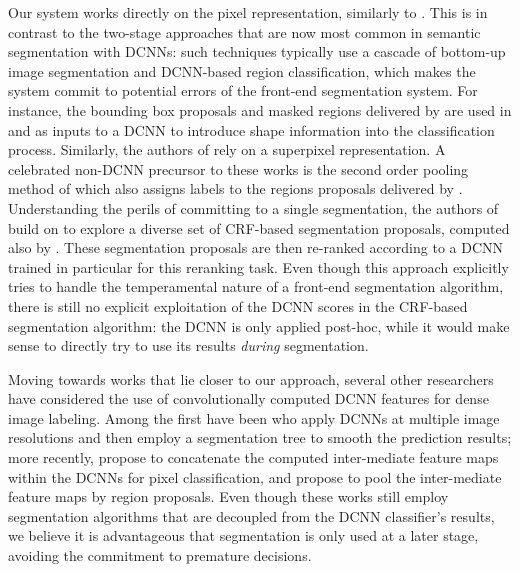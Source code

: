 
Our system works directly on the pixel representation, similarly to \citet{long2014fully}. This is in contrast to the two-stage approaches that are now most common in semantic segmentation with DCNNs: such techniques typically use a cascade of bottom-up image segmentation and DCNN-based region classification, which makes the system commit to potential errors of the front-end segmentation system.  
For instance, the bounding box proposals and masked regions delivered by \citep{arbelaez2014multiscale, Uijlings13} are used in 
\citet{girshick2014rcnn} and \cite{hariharan2014simultaneous}  as inputs to a DCNN to introduce  shape information into the classification process. Similarly, the authors of  \citet{mostajabi2014feedforward} rely on a superpixel representation. A celebrated  non-DCNN precursor to these  works
is the second order pooling method of \citep{carreira2012semantic} which also assigns labels to the regions proposals delivered by \citep{carreira2012cpmc}. 
Understanding the perils of committing to a single segmentation, the authors of \citet{cogswell2014combining} 
build on \citep{yadollahpour2013discriminative} to explore a diverse set of CRF-based segmentation proposals, computed also by \citep{carreira2012cpmc}. These segmentation proposals are then re-ranked according to a DCNN trained in  particular for this reranking task. Even though this approach explicitly tries to handle the temperamental nature of a front-end segmentation algorithm, there is still no explicit exploitation of the DCNN scores in  the CRF-based segmentation algorithm: the DCNN is only applied post-hoc, while it would make sense to directly try to use its results {\em during} segmentation. 

Moving towards works that lie closer to our approach, several other researchers have considered the use of convolutionally computed DCNN features for dense image labeling. Among the first have been
\citet{farabet2013learning} who apply DCNNs at multiple image resolutions and then employ a segmentation tree to smooth the prediction results; more recently, \citet{hariharan2014hypercolumns} propose to concatenate the computed inter-mediate feature maps within the DCNNs for pixel classification, and \citet{dai2014convolutional} propose to pool the inter-mediate feature maps by region proposals. Even though these works still employ  segmentation algorithms that are  decoupled from the DCNN classifier's results, we believe it is advantageous that segmentation is only used at a later stage, avoiding the commitment  to premature decisions. 

